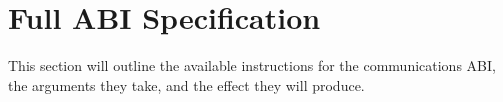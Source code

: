\newcommand{\abispec}[6]{
\subsection{\texttt{#1}}

\begin{tabularx}{\textwidth}{>{\hsize=.5\hsize}XX}
\textbf{Instruction byte:}               & \texttt{#2} \\
\textbf{Argument bytes:}                 & #3 \\
\textbf{Argument type(s):}               & \texttt{#4} \\
\textbf{Action:}                         & #5 \\
\textbf{Relation to low-level commands:} & #6 \\
\end{tabularx}
}

\section{Full ABI Specification} \label{abi}

This section will outline the available instructions for the communications
ABI, the arguments they take, and the effect they will produce.

